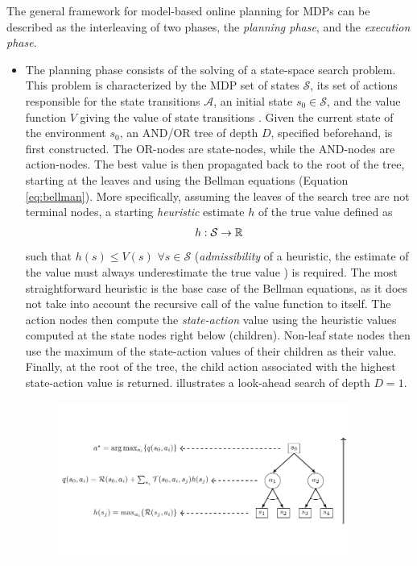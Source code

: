 \begin{itemize}
    The general framework for model-based online planning for MDPs can be described as the interleaving of two phases, the \textit{planning phase}, and the \textit{execution phase}. 
    \begin{itemize}
        \item The planning phase consists of the solving of a state-space search problem. This problem is characterized by the MDP set of states $\mathcal{S}$, its set of actions responsible for the state transitions $\mathcal{A}$, an initial state $s_0 \in \mathcal{S}$, and the value function $V$ giving the value of state transitions \cite{searchheur}. Given the current state of the environment $s_0$, an AND/OR tree of depth $D$, specified beforehand, is first constructed. The OR-nodes are state-nodes, while the AND-nodes are action-nodes. The best value is then propagated back to the root of the tree, starting at the leaves and using the Bellman equations (Equation \ref{eq:bellman}). More specifically, assuming the leaves of the search tree are not terminal nodes, a starting \textit{heuristic} estimate $h$ of the true value defined as 
        \begin{align}
            h: \mathcal{S} \rightarrow \mathbb{R}
        \end{align}
        such that $h(s) \leq V(s) \,\, \forall s \in \mathcal{S}$ (\textit{admissibility} of a heuristic, the estimate of the value must always underestimate the true value \cite{Russell:2009:AIM:1671238}) is required. The most straightforward heuristic is the base case of the Bellman equations, as it does not take into account the recursive call of the value function to itself. The action nodes then compute the \textit{state-action} value using the heuristic values computed at the state nodes right below (children). Non-leaf state nodes then use the maximum of the state-action values of their children as their value. Finally, at the root of the tree, the child action associated with the highest state-action value is returned.  illustrates a look-ahead search of depth $D = 1$.
        \begin{figure}[h]
    \includegraphics[width=0.9\textwidth]{images/MasterThesisAndOrTree(1).pdf}

\end{figure}
\end{itemize}
\end{itemize}
